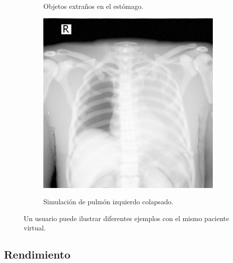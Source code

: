 \begin{figure}[h]
\begin{subfigure}[b]{0.3\linewidth}
        \caption{Objetos extraños en el estómago.}
    \end{subfigure}
    \null\hfill
     \begin{subfigure}[b]{0.3\linewidth}
        \centering
        {\includegraphics[width=\linewidth]{IMG/HVPLung.png}}
        \caption{Simulación de pulmón izquierdo colapsado.}
    \end{subfigure}
    \caption{\label{fig:diseaseresult} Un usuario puede ilustrar diferentes ejemplos con el mismo paciente virtual.}
   \end{figure}


\clearpage
\subsection{Rendimiento}

